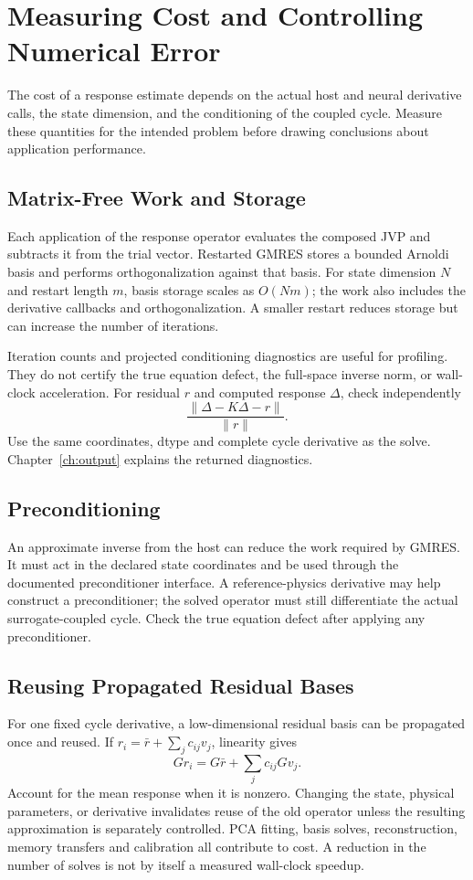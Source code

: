 \chapter{Measuring Cost and Controlling Numerical Error}
\label{ch:perf}

The cost of a response estimate depends on the actual host and neural
derivative calls, the state dimension, and the conditioning of the coupled
cycle. Measure these quantities for the intended problem before drawing
conclusions about application performance.

\section{Matrix-Free Work and Storage}
Each application of the response operator evaluates the composed JVP and
subtracts it from the trial vector. Restarted GMRES stores a bounded
Arnoldi basis and performs orthogonalization against that basis. For state
dimension $N$ and restart length $m$, basis storage scales as $O(Nm)$;
the work also includes the derivative callbacks and orthogonalization.
A smaller restart reduces storage but can increase the number of iterations.

Iteration counts and projected conditioning diagnostics are useful for
profiling. They do not certify the true equation defect, the full-space
inverse norm, or wall-clock acceleration. For residual $r$ and computed
response $\Delta$, check independently
\[
  \frac{\|\Delta-K\Delta-r\|}{\|r\|}.
\]
Use the same coordinates, dtype and complete cycle derivative as the solve.
Chapter~\ref{ch:output} explains the returned diagnostics.

\section{Preconditioning}
\label{sec:precond}
An approximate inverse from the host can reduce the work required by
GMRES. It must act in the declared state coordinates and be used through
the documented preconditioner interface. A reference-physics derivative
may help construct a preconditioner; the solved operator must still
differentiate the actual surrogate-coupled cycle. Check the true equation
defect after applying any preconditioner.

\section{Reusing Propagated Residual Bases}
For one fixed cycle derivative, a low-dimensional residual basis can be
propagated once and reused. If
$r_i=\bar r+\sum_j c_{ij}v_j$, linearity gives
\[
  G r_i=G\bar r+\sum_j c_{ij}Gv_j.
\]
Account for the mean response when it is nonzero. Changing the state,
physical parameters, or derivative invalidates reuse of the old operator
unless the resulting approximation is separately controlled. PCA fitting,
basis solves, reconstruction, memory transfers and calibration all
contribute to cost. A reduction in the number of solves is not by itself
a measured wall-clock speedup.

